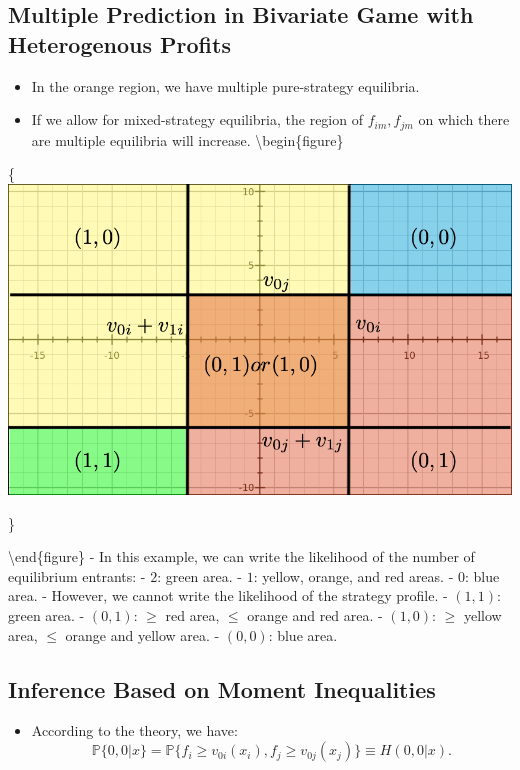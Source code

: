 \documentclass[]{book}
\providecommand{\tightlist}{%
  \setlength{\itemsep}{0pt}\setlength{\parskip}{0pt}}
\begin{document}
\subsection{Multiple Prediction in Bivariate Game with Heterogenous
Profits}\label{multiple-prediction-in-bivariate-game-with-heterogenous-profits}

\begin{itemize}
\tightlist
\item
  In the orange region, we have multiple pure-strategy equilibria.
\item
  If we allow for mixed-strategy equilibria, the region of
  \(f_{im}, f_{jm}\) on which there are multiple equilibria will
  increase. \textbackslash{}begin\{figure\}
\end{itemize}

\{\centering \includegraphics[width=0.8\linewidth]{figuretable/bivariateentry}

\}

\textbackslash{}end\{figure\} - In this example, we can write the
likelihood of the number of equilibrium entrants: - \(2\): green area. -
\(1\): yellow, orange, and red areas. - \(0\): blue area. - However, we
cannot write the likelihood of the strategy profile. - \((1, 1)\): green
area. - \((0, 1)\): \(\ge\) red area, \(\le\) orange and red area. -
\((1, 0)\): \(\ge\) yellow area, \(\le\) orange and yellow area. -
\((0, 0)\): blue area.

\subsection{Inference Based on Moment
Inequalities}\label{inference-based-on-moment-inequalities}

\begin{itemize}
\tightlist
\item
  According to the theory, we have: \[
  \mathbb{P}\{0, 0|x\} = \mathbb{P}\{f_{i} \ge v_{0i}(x_{i}), f_{j} \ge v_{0j}(x_{j})\} \equiv H(0, 0|x).
  \]
\end{itemize}
\end{document}
